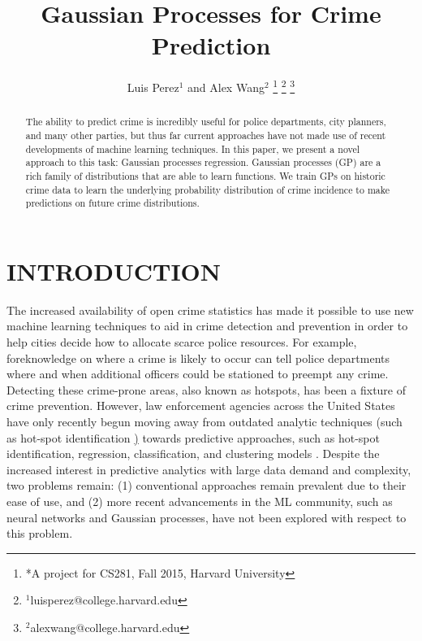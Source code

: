 \documentclass[letterpaper, 11 pt, conference]{ieeeconf}  %
\title{\LARGE \bf
Gaussian Processes for Crime Prediction
}
\author{Luis Perez$^{1}$ and Alex Wang$^{2}$%
\thanks{*A project for CS281, Fall 2015, Harvard University}%
\thanks{$^{1}$luisperez@college.harvard.edu}%
\thanks{$^{2}$alexwang@college.harvard.edu}%
}
\begin{document}
\maketitle
\thispagestyle{empty}
\pagestyle{empty}


\begin{abstract}


The ability to predict crime is incredibly useful for police departments, city planners, and many other parties, but thus far current approaches have not made use of recent developments of machine learning techniques. In this paper, we present a novel approach to this task: Gaussian processes regression. Gaussian processes (GP) are a rich family of distributions that are able to learn functions. We train GPs on historic crime data to learn the underlying probability distribution of crime incidence to make predictions on future crime distributions.
\end{abstract}


\section{INTRODUCTION}
The increased availability of open crime statistics has made it possible to use new machine learning techniques to aid in crime detection and prevention in order to help cities decide how to allocate scarce police resources. For example, foreknowledge on where a crime is likely to occur can tell police departments where and when additional officers could be stationed to preempt any crime. Detecting these crime-prone areas, also known as hotspots, has been a fixture of crime prevention. However, law enforcement agencies across the United States have only recently begun moving away from outdated analytic techniques (such as hot-spot identification \href{hotspot_mapping}) towards predictive approaches, such as hot-spot identification, regression, classification, and clustering models \cite{predictive_policing} \cite{hotspot_matrix}. Despite the increased interest in predictive analytics with large data demand and complexity, two problems remain: (1) conventional approaches remain prevalent due to their ease of use, and (2) more recent advancements in the ML community, such as neural networks and Gaussian processes, have not been explored with respect to this problem.
\end{document}
